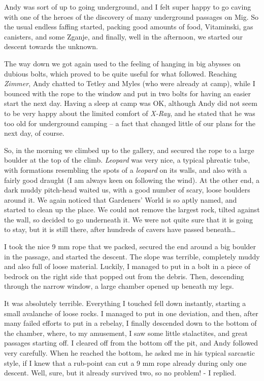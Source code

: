 Andy was sort of up to going underground, and I felt super happy to go
caving with one of the heroes of the discovery of many underground
passages on Mig. So the usual endless faffing started, packing good
amounts of food, Vitaminski, gas canisters, and some Zganje, and
finally, well in the afternoon, we started our descent towards the
unknown.

The way down we got again used to the feeling of hanging in big abysses
on dubious bolts, which proved to be quite useful for what followed.
Reaching \emph{Zimmer}, Andy chatted to Tetley and Myles (who were
already at camp), while I bounced with the rope to the window and put in
two bolts for having an easier start the next day. Having a sleep at
camp was OK, although Andy did not seem to be very happy about the
limited comfort of \emph{X-Ray}, and he stated that he was too old for
underground camping -- a fact that changed little of our plans for the
next day, of course.

So, in the morning we climbed up to the gallery, and secured the rope to
a large boulder at the top of the climb. \emph{Leopard} was very nice, a
typical phreatic tube, with formations resembling the spots of a
\emph{leopard} on its walls, and also with a fairly good draught (I am
always keen on following the wind). At the other end, a dark muddy
pitch-head waited us, with a good number of scary, loose boulders around
it. We again noticed that Gardeners' World is so aptly named, and
started to clean up the place. We could not remove the largest rock,
tilted against the wall, so decided to go underneath it. We were not
quite sure that it is going to stay, but it is still there, after
hundreds of cavers have passed beneath\ldots{}

I took the nice 9 mm rope that we packed, secured the end around a big
boulder in the passage, and started the descent. The slope was terrible,
completely muddy and also full of loose material. Luckily, I managed to
put in a bolt in a piece of bedrock on the right side that popped out
from the debris. Then, descending through the narrow window, a large
chamber opened up beneath my legs.

It was absolutely terrible. Everything I touched fell down instantly,
starting a small avalanche of loose rocks. I managed to put in one
deviation, and then, after many failed efforts to put in a rebelay, I
finally descended down to the bottom of the chamber, where, to my
amusement, I saw some little stalactites, and great passages starting
off. I cleared off from the bottom off the pit, and Andy followed very
carefully. When he reached the bottom, he asked me in his typical
sarcastic style, if I knew that a rub-point can cut a 9 mm rope already
during only one descent. Well, sure, but it already survived two, so no
problem! - I replied.

